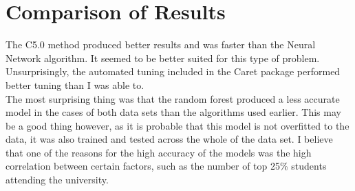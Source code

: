 \documentclass[a4paper,man,natbib]{apa6}
\begin{document}
\section{Comparison of Results}
The C5.0 method produced better results and was faster than the Neural Network algorithm. It seemed to be better suited for this type of problem. Unsurprisingly, the automated tuning included in the Caret package performed better tuning than I was able to. \\
The most surprising thing was that the random forest produced a less accurate model in the cases of both data sets than the algorithms used earlier. This may be a good thing however, as it is probable that this model is not overfitted to the data, it was also trained and tested across the whole of the data set.
I believe that one of the reasons for the high accuracy of the models was the high correlation between certain factors, such as the number of top 25\% students attending the university.

%
\end{document}
